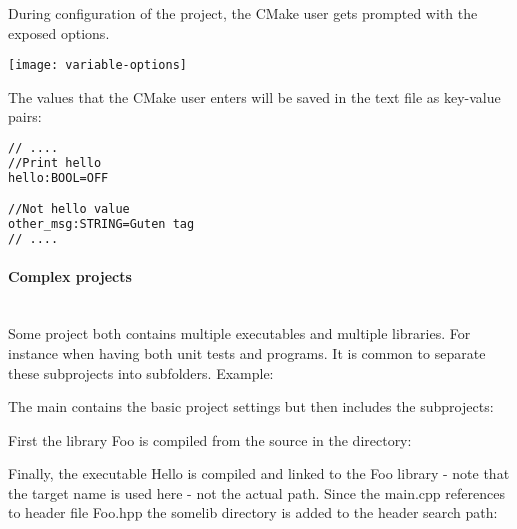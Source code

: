 \documentclass[11pt,a4paper,landscape]{scrartcl} %
\newcommand{\sectiontitle}[1]{\paragraph{#1} \ \\} %
\begin{document}
\begin{multicols}{2}


During configuration of the project, the CMake user gets prompted with the exposed options.

\texttt{[image: variable-options]}

The values that the CMake user enters will be saved in the text file  as key-value pairs:

\begin{lstlisting}[language=bash]
// ....
//Print hello
hello:BOOL=OFF

//Not hello value
other_msg:STRING=Guten tag
// ....
\end{lstlisting}

\sectiontitle{Complex projects}

Some project both contains multiple executables and multiple libraries. For instance when having both unit tests and programs. It is common to separate these subprojects into subfolders. Example:

\vspace{\baselineskip} %
\noindent{}

\vspace{\baselineskip} %

The main  contains the basic project settings but then includes the subprojects:



First the library Foo is compiled from the source in the   directory:



Finally, the executable Hello is compiled and linked to the Foo library - note that the target name is used here - not the actual path. Since the main.cpp references to header file Foo.hpp the somelib directory is added to the header search path:




\end{multicols}
\end{document}

